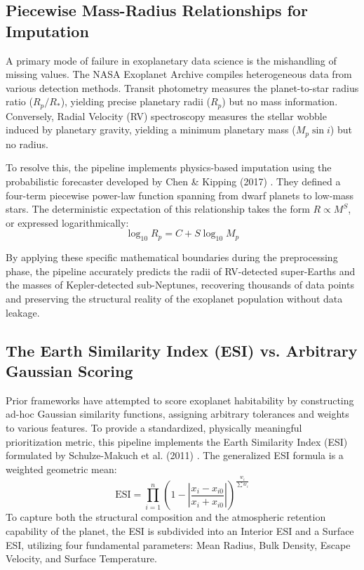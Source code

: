 \subsection{Piecewise Mass-Radius Relationships for Imputation}
A primary mode of failure in exoplanetary data science is the mishandling of missing values. The NASA Exoplanet Archive compiles heterogeneous data from various detection methods. Transit photometry measures the planet-to-star radius ratio ($R_p/R_*$), yielding precise planetary radii ($R_p$) but no mass information. Conversely, Radial Velocity (RV) spectroscopy measures the stellar wobble induced by planetary gravity, yielding a minimum planetary mass ($M_p \sin i$) but no radius.

To resolve this, the pipeline implements physics-based imputation using the probabilistic forecaster developed by Chen \& Kipping (2017) \cite{MassRadiusRelation}. They defined a four-term piecewise power-law function spanning from dwarf planets to low-mass stars. The deterministic expectation of this relationship takes the form $R \propto M^S$, or expressed logarithmically:
\begin{equation}
\log_{10} R_p = C + S \log_{10} M_p
\end{equation}

By applying these specific mathematical boundaries during the preprocessing phase, the pipeline accurately predicts the radii of RV-detected super-Earths and the masses of Kepler-detected sub-Neptunes, recovering thousands of data points and preserving the structural reality of the exoplanet population without data leakage.

\subsection{The Earth Similarity Index (ESI) vs. Arbitrary Gaussian Scoring}
Prior frameworks have attempted to score exoplanet habitability by constructing ad-hoc Gaussian similarity functions, assigning arbitrary tolerances and weights to various features. To provide a standardized, physically meaningful prioritization metric, this pipeline implements the Earth Similarity Index (ESI) formulated by Schulze-Makuch et al. (2011) \cite{EarthSimilarityIndex}. 
The generalized ESI formula is a weighted geometric mean:
\begin{equation}
\text{ESI} = \prod_{i=1}^n \left( 1 - \left| \frac{x_i - x_{i0}}{x_i + x_{i0}} \right| \right)^{\frac{w_i}{\sum w_i}}
\end{equation}
To capture both the structural composition and the atmospheric retention capability of the planet, the ESI is subdivided into an Interior ESI and a Surface ESI, utilizing four fundamental parameters: Mean Radius, Bulk Density, Escape Velocity, and Surface Temperature.

